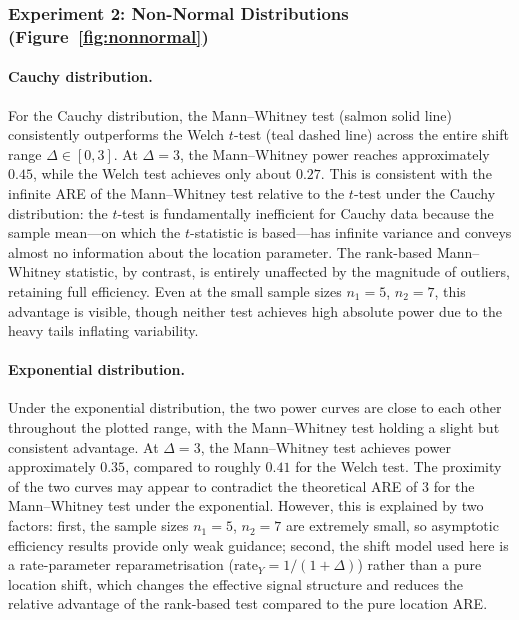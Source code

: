 \documentclass[10pt]{article}
\begin{document}
\subsubsection{Experiment 2: Non-Normal Distributions
(Figure~\ref{fig:nonnormal})}

\paragraph{Cauchy distribution.}
For the Cauchy distribution, the Mann--Whitney test (salmon solid line)
consistently outperforms the Welch $t$-test (teal dashed line) across the
entire shift range $\Delta \in [0, 3]$. At $\Delta = 3$, the Mann--Whitney
power reaches approximately $0.45$, while the Welch test achieves only about
$0.27$. This is consistent with the infinite ARE of the Mann--Whitney test
relative to the $t$-test under the Cauchy distribution: the $t$-test is
fundamentally inefficient for Cauchy data because the sample mean---on which
the $t$-statistic is based---has infinite variance and conveys almost no
information about the location parameter. The rank-based Mann--Whitney statistic,
by contrast, is entirely unaffected by the magnitude of outliers, retaining
full efficiency. Even at the small sample sizes $n_1 = 5$, $n_2 = 7$, this
advantage is visible, though neither test achieves high absolute power due to
the heavy tails inflating variability.

\paragraph{Exponential distribution.}
Under the exponential distribution, the two power curves are close to each
other throughout the plotted range, with the Mann--Whitney test holding a
slight but consistent advantage. At $\Delta = 3$, the Mann--Whitney test
achieves power approximately $0.35$, compared to roughly $0.41$ for the Welch
test. The proximity of the two curves may appear to contradict the theoretical
ARE of $3$ for the Mann--Whitney test under the exponential. However, this is
explained by two factors: first, the sample sizes $n_1 = 5$, $n_2 = 7$ are
extremely small, so asymptotic efficiency results provide only weak guidance;
second, the shift model used here is a rate-parameter reparametrisation
($\text{rate}_Y = 1/(1+\Delta)$) rather than a pure location shift, which
changes the effective signal structure and reduces the relative advantage of
the rank-based test compared to the pure location ARE.
\end{document}

